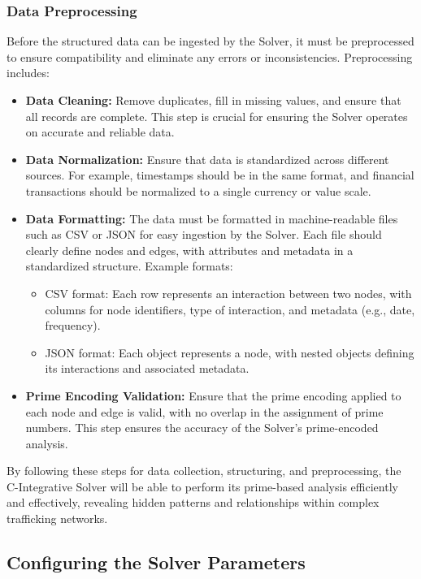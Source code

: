 \documentclass[%
 preprint, linenumbers,
 amsmath,amssymb,
 aps, physrev,
]{revtex4-2}
\begin{document}
\subsubsection{Data Preprocessing}

Before the structured data can be ingested by the Solver, it must be preprocessed to ensure compatibility and eliminate any errors or inconsistencies. Preprocessing includes:
\begin{itemize}
    \item \textbf{Data Cleaning:} Remove duplicates, fill in missing values, and ensure that all records are complete. This step is crucial for ensuring the Solver operates on accurate and reliable data.
    \item \textbf{Data Normalization:} Ensure that data is standardized across different sources. For example, timestamps should be in the same format, and financial transactions should be normalized to a single currency or value scale.
    \item \textbf{Data Formatting:} The data must be formatted in machine-readable files such as CSV or JSON for easy ingestion by the Solver. Each file should clearly define nodes and edges, with attributes and metadata in a standardized structure. Example formats:
    \begin{itemize}
        \item CSV format: Each row represents an interaction between two nodes, with columns for node identifiers, type of interaction, and metadata (e.g., date, frequency).
        \item JSON format: Each object represents a node, with nested objects defining its interactions and associated metadata.
    \end{itemize}
    \item \textbf{Prime Encoding Validation:} Ensure that the prime encoding applied to each node and edge is valid, with no overlap in the assignment of prime numbers. This step ensures the accuracy of the Solver’s prime-encoded analysis.
\end{itemize}

By following these steps for data collection, structuring, and preprocessing, the C-Integrative Solver will be able to perform its prime-based analysis efficiently and effectively, revealing hidden patterns and relationships within complex trafficking networks.

\subsection{Configuring the Solver Parameters}
\end{document}
